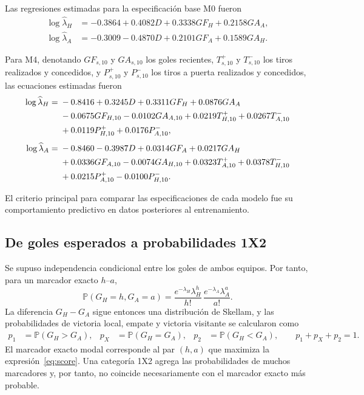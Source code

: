 \documentclass[11pt,a4paper]{article}
\newcommand{\Prob}{\mathbb{P}}
\begin{document}
Las regresiones estimadas para la especificación base M0 fueron
\begin{align}
\log\widehat\lambda_H&=-0.3864+0.4082D+0.3338GF_H+0.2158GA_A,\\
\log\widehat\lambda_A&=-0.3009-0.4870D+0.2101GF_A+0.1589GA_H.
\label{eq:m0}
\end{align}

Para M4, denotando $GF_{s,10}$ y $GA_{s,10}$ los goles recientes, $T_{s,10}^{+}$ y $T_{s,10}^{-}$ los tiros realizados y concedidos, y $P_{s,10}^{+}$ y $P_{s,10}^{-}$ los tiros a puerta realizados y concedidos, las ecuaciones estimadas fueron
\begin{align}
\log\widehat\lambda_H={}&-0.8416+0.3245D+0.3311GF_H+0.0876GA_A\notag\\
&-0.0675GF_{H,10}-0.0102GA_{A,10}+0.0219T^+_{H,10}+0.0267T^-_{A,10}\notag\\
&+0.0119P^+_{H,10}+0.0176P^-_{A,10},\\[0.3em]
\log\widehat\lambda_A={}&-0.8460-0.3987D+0.0314GF_A+0.0217GA_H\notag\\
&+0.0336GF_{A,10}-0.0074GA_{H,10}+0.0323T^+_{A,10}+0.0378T^-_{H,10}\notag\\
&+0.0215P^+_{A,10}-0.0100P^-_{H,10}.
\label{eq:m4}
\end{align}

 El criterio principal para comparar las especificaciones de cada modelo fue su comportamiento predictivo en datos posteriores al entrenamiento.

\subsection{De goles esperados a probabilidades 1X2}
Se supuso independencia condicional entre los goles de ambos equipos. Por tanto, para un marcador exacto $h$--$a$,
\begin{equation}
\Prob(G_H=h,G_A=a)=\frac{e^{-\lambda_H}\lambda_H^h}{h!}\,
\frac{e^{-\lambda_A}\lambda_A^a}{a!}.
\label{eq:score}
\end{equation}
La diferencia $G_H-G_A$ sigue entonces una distribución de Skellam, y las probabilidades de victoria local, empate y victoria visitante se calcularon como
\begin{align}
p_1&=\Prob(G_H>G_A), & p_X&=\Prob(G_H=G_A), & p_2&=\Prob(G_H<G_A),
\qquad p_1+p_X+p_2=1.
\label{eq:1x2}
\end{align}
El marcador exacto modal corresponde al par $(h,a)$ que maximiza la expresión~\eqref{eq:score}. Una categoría 1X2 agrega las probabilidades de muchos marcadores y, por tanto, no coincide necesariamente con el marcador exacto más probable.
\end{document}
